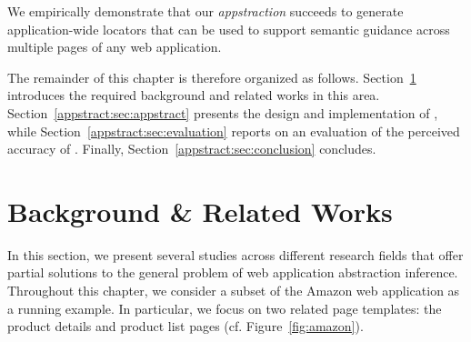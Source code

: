We empirically demonstrate that our \emph{appstraction} succeeds to generate application-wide locators that can be used to support semantic guidance across multiple pages of any web application.

The remainder of this chapter is therefore organized as follows.
Section~\ref{appstract:sec:related} introduces the required background and related works in this area.
Section~\ref{appstract:sec:appstract} presents the design and implementation of \textsc{\appstract{}}, while Section~\ref{appstract:sec:evaluation} reports on an evaluation of the perceived accuracy of \textsc{\appstract{}}.
Finally, Section~\ref{appstract:sec:conclusion} concludes.

\section{Background \& Related Works}\label{appstract:sec:related}
In this section, we present several studies across different research fields that offer partial solutions to the general problem of web application abstraction inference. 
Throughout this chapter, we consider a subset of the Amazon web application as a running example.
In particular, we focus on two related page templates: the product details and product list pages (cf. Figure~\ref{fig:amazon}).

